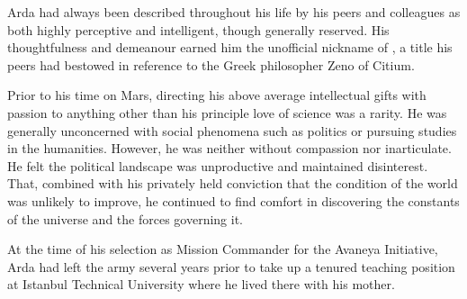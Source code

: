Arda had always been described throughout his life by his peers and colleagues as both highly perceptive and intelligent, though generally reserved. His thoughtfulness and demeanour earned him the unofficial nickname of , a title his peers had bestowed in reference to the Greek philosopher Zeno of Citium.

Prior to his time on Mars, directing his above average intellectual gifts with passion to anything other than his principle love of science was a rarity. He was generally unconcerned with social phenomena such as politics or pursuing studies in the humanities. However, he was neither without compassion nor inarticulate. He felt the political landscape was unproductive and maintained disinterest. That, combined with his privately held conviction that the condition of the world was unlikely to improve, he continued to find comfort in discovering the constants of the universe and the forces governing it.

At the time of his selection as Mission Commander for the Avaneya Initiative, Arda had left the army several years prior to take up a tenured teaching position at Istanbul Technical University where he lived there with his mother.
